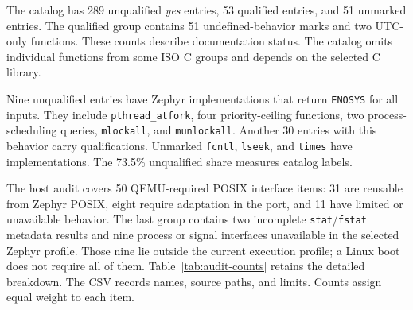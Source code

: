 \documentclass[10pt,a4paper,twocolumn]{article}
\newcommand{\code}[1]{\texttt{#1}}
\begin{document}
The catalog has 289 unqualified \emph{yes} entries, 53 qualified entries,
and 51 unmarked entries. The qualified group contains 51 undefined-behavior
marks and two UTC-only functions. These counts describe documentation status.
The catalog omits individual functions from some ISO C groups and depends
on the selected C library.

Nine unqualified entries have Zephyr implementations that return
\code{ENOSYS} for all inputs. They include \code{pthread\_atfork}, four
priority-ceiling functions, two process-scheduling queries, \code{mlockall},
and \code{munlockall}. Another 30 entries with this behavior carry
qualifications. Unmarked \code{fcntl}, \code{lseek}, and \code{times} have
implementations. The 73.5\% unqualified share measures catalog labels.

The host audit covers 50 QEMU-required POSIX interface items: 31 are reusable
from Zephyr POSIX, eight require adaptation in the port, and 11 have limited
or unavailable behavior. The last group contains two incomplete
\code{stat}/\code{fstat} metadata results and nine process or signal
interfaces unavailable in the selected Zephyr profile. Those nine lie outside
the current execution profile; a Linux boot does not require all of them.
Table~\ref{tab:audit-counts} retains the detailed breakdown. The CSV records
names, source paths, and limits. Counts assign equal weight to each item.
\end{document}
